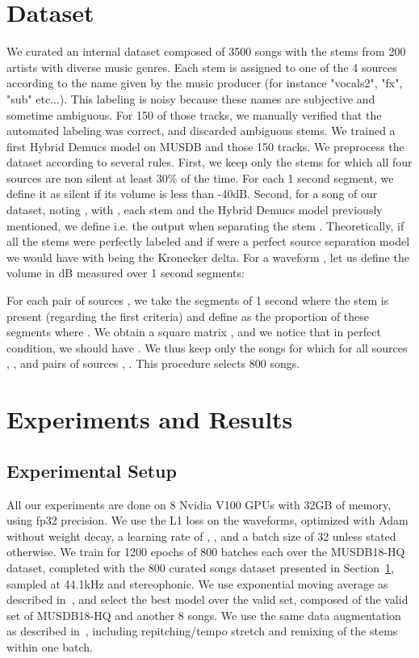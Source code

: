 \documentclass{article}
\begin{document}
\section{Dataset}
\label{sec:dataset}
We curated an internal dataset composed of 3500 songs with the stems from 200 artists with diverse music genres. Each stem is assigned to one of the 4 sources according to the name given by the music producer (for instance "vocals2", "fx", "sub" etc...). This labeling is noisy because these names are subjective and sometime ambiguous. 
For 150 of those tracks, we manually verified that the automated 
labeling was correct, and discarded ambiguous stems. 
We trained a first Hybrid Demucs model on MUSDB and those 150 tracks.
We preprocess the dataset according to several rules.
First, we keep only the stems for which all four sources are non silent at least 30\% of the time. For each 1 second segment, we define it as silent if its volume is less than -40dB. 
Second, for a song  of our dataset, noting , with , each stem and  the Hybrid Demucs model previously mentioned, we define  i.e. the output  when separating the stem . Theoretically, if all the stems were perfectly labeled and if  were a perfect source separation model we would have  with  being the Kronecker delta.
For a waveform , let us define the volume in dB measured over 1 second segments:

For each pair of sources , we take the segments of 1 second where the stem is present (regarding the first criteria) and define  as the proportion of these segments where .
We obtain a square matrix , and we notice that in perfect condition, we should have . We thus keep only the songs for which for all sources , , and pairs
of sources , . This procedure selects 800 songs.


\section{Experiments and Results}
\label{sec:results}
\subsection{Experimental Setup}
All our experiments are done on 8 Nvidia V100 GPUs with 32GB of memory, using fp32 precision. We use the L1 loss on the waveforms, optimized with Adam \cite{adam} without weight decay, a learning rate of , ,  and a batch size of 32 unless stated otherwise. We train for 1200 epochs of 800 batches each over the MUSDB18-HQ dataset, completed with
the 800 curated songs dataset presented in Section~\ref{sec:dataset}, sampled at 44.1kHz and stereophonic. We use exponential moving average
as described in~\cite{defossez2021hybrid}, and select the best model over the valid set, composed of the valid set
of MUSDB18-HQ and another 8 songs.
We use the same data augmentation as described in~\cite{defossez2021hybrid}, including repitching/tempo stretch
and remixing of the stems within one batch.
\end{document}
